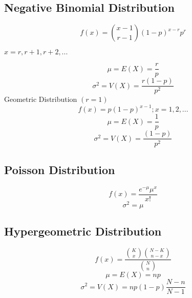\documentclass[twocolumn]{article}
\begin{document}
\subsection{Negative Binomial Distribution}
\begin{equation}
    f(x) = \binom{x-1}{r-1}(1-p)^{x-r}p^{r}
\end{equation}
\begin{center}
    $x = r,r+1,r+2,...$
\end{center}
\begin{equation}
    \mu = E(X) = \frac{r}{p}
\end{equation}
\begin{equation}
    \sigma^{2} = V(X) = \frac{r(1-p)}{p^{2}}
\end{equation}
Geometric Distribution $(r = 1)$
\begin{equation}
    f(x) = p(1-p)^{x-1}; x = 1,2,...
\end{equation}
\begin{equation}
    \mu = E(X) = \frac{1}{p}
\end{equation}
\begin{equation}
    \sigma^{2} = V(X) = \frac{(1-p)}{p^{2}}
\end{equation}
\subsection{Poisson Distribution}
\begin{equation}
    f(x) = \frac{e^{-\mu}\mu^{x}}{x!}
\end{equation}
\begin{equation}
    \sigma^2 = \mu
\end{equation}
\subsection{Hypergeometric Distribution}
\begin{equation}
    f(x) = \frac{{\binom{K}{x}}{\binom{N-K}{n-x}}}{\binom{N}{n}}
\end{equation}
\begin{equation}
    \mu = E(X) = np
\end{equation}
\begin{equation}
    \sigma^{2} = V(X) = np(1-p)\frac{N-n}{N-1}
\end{equation}
\end{document}
